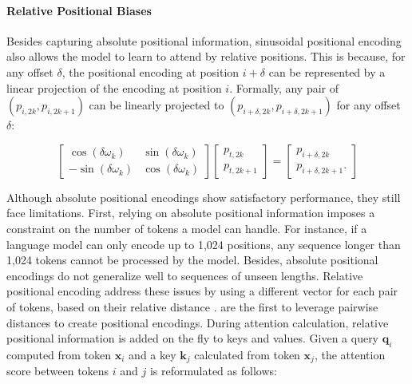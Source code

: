 

\paragraph{Relative Positional Biases} Besides capturing absolute positional information, sinusoidal positional encoding also allows the model to learn to attend by relative positions. This is because, for any offset $\delta$, the positional encoding at position $i + \delta$ can be represented by a linear projection of the encoding at position $i$. Formally, any pair of $(p_{i, 2k}, p_{i, 2k+1})$ can be linearly projected to $(p_{i + \delta, 2k}, p_{i + \delta, 2k+1})$ for any offset $\delta$:

\begin{equation}
    \begin{bmatrix}
        \cos(\delta \omega_k)  & \sin(\delta \omega_k) \\
        -\sin(\delta \omega_k) & \cos(\delta \omega_k)
    \end{bmatrix}
    \begin{bmatrix}
        p_{t, 2k}   \\
        p_{t, 2k+1}
    \end{bmatrix}
    = \begin{bmatrix}
        p_{i + \delta, 2k}   \\
        p_{i + \delta, 2k+1}.
    \end{bmatrix}
\end{equation}

Although absolute positional encodings show satisfactory performance, they still face limitations. First, relying on absolute positional information imposes a constraint on the number of tokens a model can handle. For instance, if a language model can only encode up to 1,024 positions, any sequence longer than 1,024 tokens cannot be processed by the model. Besides, absolute positional encodings do not generalize well to sequences of unseen lengths. Relative positional encoding address these issues by using a different vector for each pair of tokens, based on their relative distance \citep{shaw2018self, huang2018music, ke2020rethinking}.  \citet{shaw2018self} are the first to leverage pairwise distances to create positional encodings. During attention calculation, relative positional information is added on the fly to keys and values. Given a query $\bm{q}_i$ computed from token $\bm{x}_i$ and a key $\bm{k}_j$ calculated from token $\bm{x}_j$, the attention score between tokens $i$ and $j$ is reformulated as follows:

